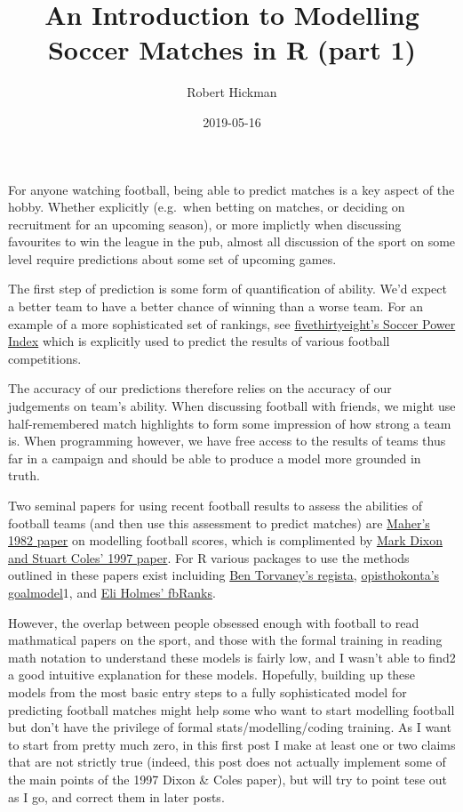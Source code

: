 \documentclass[]{article}
\title{An Introduction to Modelling Soccer Matches in R (part 1)}
\author{Robert Hickman}
\date{2019-05-16}
\begin{document}
\maketitle

For anyone watching football, being able to predict matches is a key
aspect of the hobby. Whether explicitly (e.g.~when betting on matches,
or deciding on recruitment for an upcoming season), or more implictly
when discussing favourites to win the league in the pub, almost all
discussion of the sport on some level require predictions about some set
of upcoming games.

The first step of prediction is some form of quantification of ability.
We'd expect a better team to have a better chance of winning than a
worse team. For an example of a more sophisticated set of rankings, see
\href{https://projects.fivethirtyeight.com/soccer-predictions/}{fivethirtyeight's
Soccer Power Index} which is explicitly used to predict the results of
various football competitions.

The accuracy of our predictions therefore relies on the accuracy of our
judgements on team's ability. When discussing football with friends, we
might use half-remembered match highlights to form some impression of
how strong a team is. When programming however, we have free access to
the results of teams thus far in a campaign and should be able to
produce a model more grounded in truth.

Two seminal papers for using recent football results to assess the
abilities of football teams (and then use this assessment to predict
matches) are
\href{https://onlinelibrary.wiley.com/doi/abs/10.1111/j.1467-9574.1982.tb00782.x}{Maher's
1982 paper} on modelling football scores, which is complimented by
\href{https://www.jstor.org/stable/pdf/2986290.pdf?casa_token=9deLgF7xOaEAAAAA:fGGfUQKOsezrWBvbmphK56HddtiaohxaUNPdkDBoTApL_beghKXFlru5USztLt7dDVEMSdhAfkg8yzubZsAs7eeyZvp307iAGwqAtVSMMhwk6xhUleM}{Mark
Dixon and Stuart Coles' 1997 paper}. For R various packages to use the
methods outlined in these papers exist incluiding
\href{https://github.com/Torvaney/regista}{Ben Torvaney's regista},
\href{https://github.com/opisthokonta/goalmodel}{opisthokonta's
goalmodel}1, and
\href{https://cran.r-project.org/web/packages/fbRanks/index.html}{Eli
Holmes' fbRanks}.

However, the overlap between people obsessed enough with football to
read mathmatical papers on the sport, and those with the formal training
in reading math notation to understand these models is fairly low, and I
wasn't able to find2 a good intuitive explanation for these models.
Hopefully, building up these models from the most basic entry steps to a
fully sophisticated model for predicting football matches might help
some who want to start modelling football but don't have the privilege
of formal stats/modelling/coding training. As I want to start from
pretty much zero, in this first post I make at least one or two claims
that are not strictly true (indeed, this post does not actually
implement some of the main points of the 1997 Dixon \& Coles paper), but
will try to point tese out as I go, and correct them in later posts.
\end{document}
